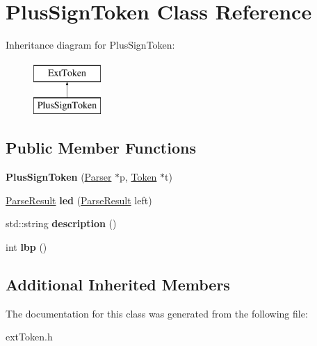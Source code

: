 \hypertarget{classPlusSignToken}{\section{Plus\-Sign\-Token Class Reference}
\label{classPlusSignToken}
}
Inheritance diagram for Plus\-Sign\-Token\-:\begin{figure}[H]
\begin{center}
\leavevmode
\includegraphics[height=2.000000cm]{classPlusSignToken}
\end{center}
\end{figure}
\subsection*{Public Member Functions}
\begin{DoxyCompactItemize}
\item 
\hypertarget{classPlusSignToken_ad480457c426f911f8286a73e8cf7f949}{{\bfseries Plus\-Sign\-Token} (\hyperlink{classParser}{Parser} $\ast$p, \hyperlink{classToken}{Token} $\ast$t)}\label{classPlusSignToken_ad480457c426f911f8286a73e8cf7f949}

\item 
\hypertarget{classPlusSignToken_a4d79a17891f92800259308ce71402526}{\hyperlink{classParseResult}{Parse\-Result} {\bfseries led} (\hyperlink{classParseResult}{Parse\-Result} left)}\label{classPlusSignToken_a4d79a17891f92800259308ce71402526}

\item 
\hypertarget{classPlusSignToken_a61a05ac9660848e13da97d5746808868}{std\-::string {\bfseries description} ()}\label{classPlusSignToken_a61a05ac9660848e13da97d5746808868}

\item 
\hypertarget{classPlusSignToken_a80753eec970928e042da350df83150f2}{int {\bfseries lbp} ()}\label{classPlusSignToken_a80753eec970928e042da350df83150f2}

\end{DoxyCompactItemize}
\subsection*{Additional Inherited Members}


The documentation for this class was generated from the following file\-:\begin{DoxyCompactItemize}
\item 
ext\-Token.\-h\end{DoxyCompactItemize}
